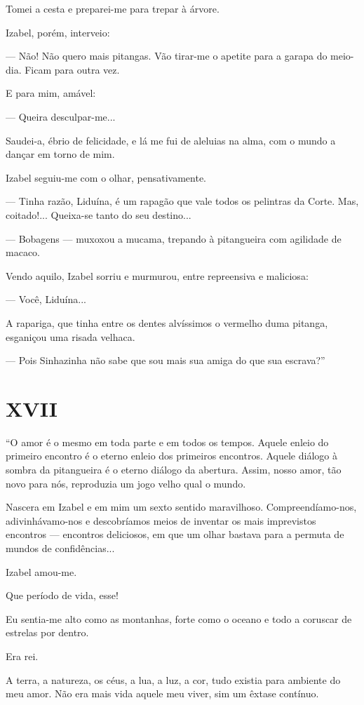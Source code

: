 Tomei a cesta e preparei-me para trepar à árvore.

Izabel, porém, interveio:

--- Não! Não quero mais pitangas. Vão tirar-me o apetite para a garapa
do meio-dia. Ficam para outra vez.

E para mim, amável:

--- Queira desculpar-me...

Saudei-a, ébrio de felicidade, e lá me fui de aleluias na alma, com o
mundo a dançar em torno de mim.

Izabel seguiu-me com o olhar, pensativamente.

--- Tinha razão, Liduína, é um rapagão que vale todos os pelintras da
Corte. Mas, coitado!... Queixa-se tanto do seu destino...

--- Bobagens --- muxoxou a mucama, trepando à pitangueira com agilidade
de macaco.

Vendo aquilo, Izabel sorriu e murmurou, entre repreensiva e maliciosa:

--- Você, Liduína...

A rapariga, que tinha entre os dentes alvíssimos o vermelho duma
pitanga, esganiçou uma risada velhaca.

--- Pois Sinhazinha não sabe que sou mais sua amiga do que sua
escrava?''

\section{XVII}

``O amor é o mesmo em toda parte e em todos os tempos. Aquele enleio do
primeiro encontro é o eterno enleio dos primeiros encontros. Aquele
diálogo à sombra da pitangueira é o eterno diálogo da abertura. Assim,
nosso amor, tão novo para nós, reproduzia um jogo velho qual o mundo.

Nascera em Izabel e em mim um sexto sentido maravilhoso.
Compreendíamo-nos, adivinhávamo-nos e descobríamos meios de inventar os
mais imprevistos encontros --- encontros deliciosos, em que um olhar
bastava para a permuta de mundos de confidências...

Izabel amou-me.

Que período de vida, esse!

Eu sentia-me alto como as montanhas, forte como o oceano e todo a
coruscar de estrelas por dentro.

Era rei.

A terra, a natureza, os céus, a lua, a luz, a cor, tudo existia para
ambiente do meu amor. Não era mais vida aquele meu viver, sim um êxtase
contínuo.

